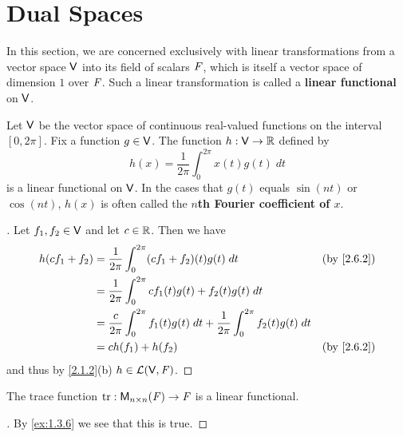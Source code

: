 \section{Dual Spaces}\label{sec:2.6}

\begin{defn}\label{2.6.1}
	In this section, we are concerned exclusively with linear transformations from a vector space \(\mathsf{V}\) into its field of scalars \(\mathit{F}\), which is itself a vector space of dimension \(1\) over \(\mathit{F}\).
	Such a linear transformation is called a \textbf{linear functional} on \(\mathsf{V}\).
\end{defn}

\begin{eg}\label{2.6.2}
	Let \(\mathsf{V}\) be the vector space of continuous real-valued functions on the interval \([0, 2 \pi]\).
	Fix a function \(g \in \mathsf{V}\).
	The function \(h : \mathsf{V} \to \mathbb{R}\) defined by
	\[
		h(x) = \frac{1}{2 \pi} \int_{0}^{2 \pi} x(t) g(t) \; dt
	\]
	is a linear functional on \(\mathsf{V}\).
	In the cases that \(g(t)\) equals \(\sin(nt)\) or \(\cos(nt)\), \(h(x)\) is often called the \textbf{\(n\)th Fourier coefficient of \(x\)}.
\end{eg}

\begin{proof}[]
	Let \(f_1, f_2 \in \mathsf{V}\) and let \(c \in \mathbb{R}\).
	Then we have
	\begin{align*}
		h(cf_1 + f_2) & = \frac{1}{2 \pi} \int_{0}^{2 \pi} (cf_1 + f_2)(t) g(t) \; dt                                             &  & \by{2.6.2} \\
		              & = \frac{1}{2 \pi} \int_{0}^{2 \pi} cf_1(t) g(t) + f_2(t) g(t) \; dt                                                       \\
		              & = \frac{c}{2 \pi} \int_{0}^{2 \pi} f_1(t) g(t) \; dt + \frac{1}{2 \pi} \int_{0}^{2 \pi} f_2(t) g(t) \; dt                 \\
		              & = c h(f_1) + h(f_2)                                                                                       &  & \by{2.6.2}
	\end{align*}
	and thus by \cref{2.1.2}(b) \(h \in \mathcal{L}(\mathsf{V}, \mathit{F})\).
\end{proof}

\begin{eg}\label{2.6.3}
	The trace function \(\tr : \ms{n}{n}{\F} \to \F\) is a linear functional.
\end{eg}

\begin{proof}[]
	By \cref{ex:1.3.6} we see that this is true.
\end{proof}

